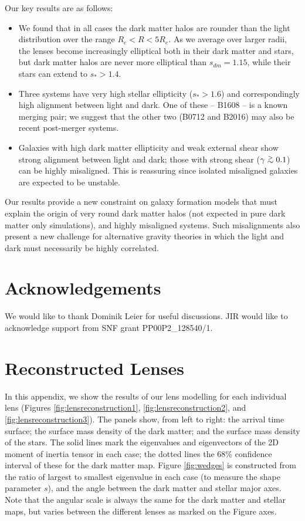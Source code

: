 \documentclass[useAMS,usenatbib]{mn2e}
\def\gtsima{$\; \buildrel > \over \sim \;$}
\def\simgt{\lower.5ex\hbox{\gtsima}}
\begin{document}
Our key results are as follows: 

\begin{itemize}
\item We found that in all cases the dark matter halos are rounder than the light distribution over the range $R_e < R < 5R_e$. As we average over larger radii, the lenses become increasingly elliptical both in their dark matter and stars, but dark matter halos are never more elliptical than $s_{dm} = 1.15$, while their stars can extend to $s_* > 1.4$. 

\item Three systems have very high stellar ellipticity ($s_* > 1.6$) and correspondingly high alignment between light and dark. One of these -- B1608 -- is a known merging pair; we suggest that the other two (B0712 and B2016) may also be recent post-merger systems. 

\item Galaxies with high dark matter ellipticity and weak external shear show strong alignment between light and dark; those with strong shear ($\gamma \simgt 0.1$) can be highly misaligned. This is reassuring since isolated misaligned galaxies are expected to be unstable.
\end{itemize}

Our results provide a new constraint on galaxy formation models that must explain the origin of very round dark matter halos (not expected in pure dark matter only simulations), and highly misaligned systems. Such misalignments also present a new challenge for alternative gravity theories in which the light and dark must necessarily be highly correlated.

\section{Acknowledgements}\label{sec:acknowledgements}
We would like to thank Dominik Leier for useful discussions. JIR would like to acknowledge support from SNF grant PP00P2\_128540/1.




\appendix
\section{Reconstructed Lenses}\label{sec:reconstructions}

In this appendix, we show the results of our lens modelling for each individual lens (Figures \ref{fig:lensreconstruction1}, \ref{fig:lensreconstruction2}, and \ref{fig:lensreconstruction3}). The panels show, from left to right: the arrival time surface; the surface mass density of the dark matter; and the surface mass density of the stars. The solid lines mark the eigenvalues and eigenvectors of the 2D moment of inertia tensor in each case; the dotted lines the 68\% confidence interval of these for the dark matter map. Figure \ref{fig:wedges} is constructed from the ratio of largest to smallest eigenvalue in each case (to measure the shape parameter $s$), and the angle between the dark matter and stellar major axes. Note that the angular scale is always the same for the dark matter and stellar maps, but varies between the different lenses as marked on the Figure axes. 
\end{document}
